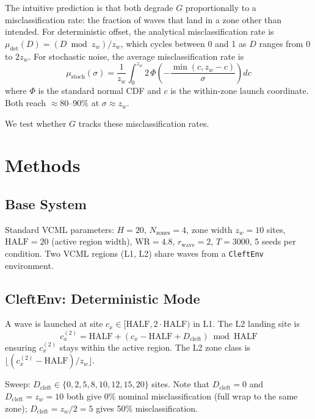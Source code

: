 \documentclass[11pt]{article}
\begin{document}
The intuitive prediction is that both degrade $G$ proportionally to a
misclassification rate: the fraction of waves that land in a zone other
than intended.
For deterministic offset, the analytical misclassification rate is
$\mu_\mathrm{det}(D) = (D \bmod z_w)/z_w$, which cycles between 0 and 1
as $D$ ranges from 0 to $2z_w$.
For stochastic noise, the average misclassification rate is
\begin{equation}
  \mu_\mathrm{stoch}(\sigma) = \frac{1}{z_w}
    \int_0^{z_w} 2\,\Phi\!\left(-\frac{\min(c, z_w-c)}{\sigma}\right) dc
\end{equation}
where $\Phi$ is the standard normal CDF and $c$ is the within-zone
launch coordinate.
Both reach $\approx 80$--90\% at $\sigma \approx z_w$.

We test whether $G$ tracks these misclassification rates.

\section{Methods}

\subsection{Base System}

Standard VCML parameters: $H = 20$, $N_\mathrm{zones} = 4$,
zone width $z_w = 10$ sites, $\mathrm{HALF} = 20$ (active region width),
$\mathrm{WR} = 4.8$, $r_\mathrm{wave} = 2$, $T = 3000$, 5 seeds per
condition.
Two VCML regions (L1, L2) share waves from a \texttt{CleftEnv}
environment.

\subsection{CleftEnv: Deterministic Mode}

A wave is launched at site $c_x \in [\mathrm{HALF}, 2\cdot\mathrm{HALF})$
in L1.
The L2 landing site is
\begin{equation}
  c_x^{(2)} = \mathrm{HALF} + (c_x - \mathrm{HALF} + D_\mathrm{cleft})
               \bmod \mathrm{HALF}
\end{equation}
ensuring $c_x^{(2)}$ stays within the active region.
The L2 zone class is $\lfloor (c_x^{(2)} - \mathrm{HALF}) / z_w \rfloor$.

Sweep: $D_\mathrm{cleft} \in \{0, 2, 5, 8, 10, 12, 15, 20\}$ sites.
Note that $D_\mathrm{cleft} = 0$ and $D_\mathrm{cleft} = z_w = 10$
both give 0\% nominal misclassification (full wrap to the same zone);
$D_\mathrm{cleft} = z_w/2 = 5$ gives 50\% misclassification.
\end{document}
